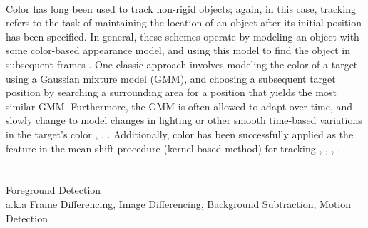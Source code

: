 \documentclass{article}
\begin{document}
\\
Color has long been used to track non-rigid objects; again, in this case, tracking refers to the task of maintaining the location of an object after its initial position has been specified. In general, these schemes operate by modeling an object with some color-based appearance model, and using this model to find the object in subsequent frames \cite{elgammal_2001}. One classic approach involves modeling the color of a target using a Gaussian mixture model (GMM), and choosing a subsequent target position by searching a surrounding area for a position that yields the most similar GMM. Furthermore, the GMM is often allowed to adapt over time, and slowly change to model changes in lighting or other smooth time-based variations in the target's color \cite{raja_1998}, \cite{mckenna_1999}, \cite{jepson_2003}. Additionally, color has been successfully applied as the feature in the mean-shift procedure (kernel-based method) for tracking \cite{comaniciu_2003}, \cite{perez_2002}, \cite{nummiaro_2003}, \cite{lee_2011}. \\
\\
\\
Foreground Detection\\
a.k.a Frame Differencing, Image Differencing, Background Subtraction, Motion Detection\\
\\
\end{document}
